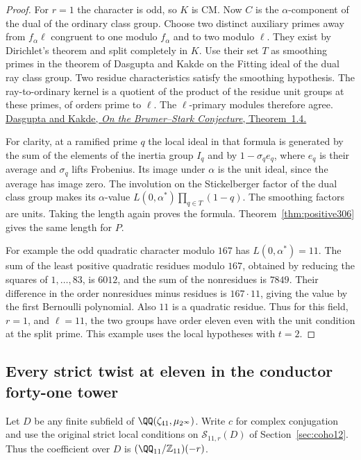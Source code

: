 \documentclass[a4paper,11pt]{article}
\theoremstyle{definition}
\theoremstyle{remark}
\newcommand{\ZZ}{\mathbb Z}\newcommand{\ord}{\operatorname{ord}}
\numberwithin{equation}{section}
\begin{document}
\begin{proof}
For \(r=1\) the character is odd, so \(K\) is CM. Now \(C\)
is the \(\alpha\)-component of the dual of the ordinary class
group. Choose two distinct auxiliary primes away from
\(f_\alpha\ell\) congruent to one modulo \(f_\alpha\) and to
two modulo \(\ell\). They exist by Dirichlet's theorem and
split completely in \(K\). Use their set \(T\) as smoothing
primes in the theorem of Dasgupta and Kakde on the Fitting
ideal of the dual ray class group. Two residue characteristics
satisfy the smoothing hypothesis. The ray-to-ordinary kernel
is a quotient of the product of the residue unit groups at
these primes, of orders prime to \(\ell\). The \(\ell\)-primary
modules therefore agree.
\href{https://arxiv.org/pdf/2010.00657}{Dasgupta and Kakde,
\emph{On the Brumer--Stark Conjecture}, Theorem~1.4.}

For clarity, at a ramified prime \(q\) the local ideal in
that formula is generated by the sum of the elements of the
inertia group \(I_q\) and by \(1-\sigma_q e_q\), where
\(e_q\) is their average and \(\sigma_q\) lifts Frobenius.
Its image under \(\alpha\) is the unit ideal, since the average
has image zero. The involution on the Stickelberger factor of
the dual class group makes its \(\alpha\)-value
\(L(0,\alpha^*)\prod_{q\in T}(1-q)\). The smoothing factors
are units. Taking the length again proves the formula.
Theorem~\ref{thm:positive306} gives the same length for \(P\).

For example the odd quadratic character modulo \(167\) has
\(L(0,\alpha^*)=11\). The sum of the least positive quadratic
residues modulo \(167\), obtained by reducing the squares of
\(1,\ldots,83\), is \(6012\), and the sum of the nonresidues is
\(7849\). Their difference in the order nonresidues minus
residues is \(167\cdot11\), giving the value by the first
Bernoulli polynomial. Also \(11\) is a quadratic residue.
Thus for this field, \(r=1\), and \(\ell=11\), the two groups
have order eleven even with the unit condition at the split
prime. This example uses the local hypotheses with \(t=2\).
\end{proof}

\subsection{Every strict twist at eleven in the conductor forty-one tower}\label{nav:II-76}
Let \(D\) be any finite subfield of
\(\QQ(\zeta_{41},\mu_{2^\infty})\). Write \(c\) for complex
conjugation and use the original strict local conditions on
\(\mathcal S_{11,r}(D)\) of Section~\ref{sec:coho12}. Thus the
coefficient over \(D\) is \((\QQ_{11}/\ZZ_{11})(-r)\).
\end{document}
